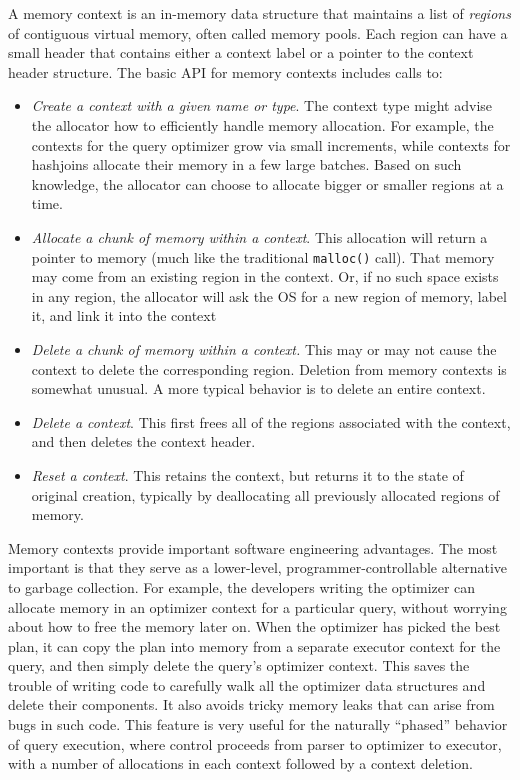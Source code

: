 \documentclass[a4paper,11pt,twoside,openright]{book}
\begin{document}
A memory context is an in-memory data structure that maintains a list of
\emph{regions} of contiguous virtual memory, often called memory pools.
Each region can have a small header that contains either a context label
or a pointer to the context header structure. The basic API for memory
contexts includes calls to:

\begin{itemize}

\item
  \emph{Create a context with a given name or type}. The context type
  might advise the allocator how to efficiently handle memory
  allocation. For example, the contexts for the query optimizer grow via
  small increments, while contexts for hashjoins allocate their memory
  in a few large batches. Based on such knowledge, the allocator can
  choose to allocate bigger or smaller regions at a time.
\end{itemize}

\begin{itemize}
\item
  \emph{Allocate a chunk of memory within a context}. This allocation
  will return a pointer to memory (much like the traditional \texttt{malloc()}
  call). That memory may come from an existing region in the context.
  Or, if no such space exists in any region, the allocator will ask the
  OS for a new region of memory, label it, and link it into the context
\item
  \emph{Delete a chunk of memory within a context.} This may or may not
  cause the context to delete the corresponding region. Deletion from
  memory contexts is somewhat unusual. A more typical behavior is to
  delete an entire context.
\item
  \emph{Delete a context}. This first frees all of the regions
  associated with the context, and then deletes the context header.
\item
  \emph{Reset a context}. This retains the context, but returns it to
  the state of original creation, typically by deallocating all
  previously allocated regions of memory.
\end{itemize}

Memory contexts provide important software engineering advantages. The
most important is that they serve as a lower-level,
programmer-controllable alternative to garbage collection. For example,
the developers writing the optimizer can allocate memory in an optimizer
context for a particular query, without worrying about how to free the
memory later on. When the optimizer has picked the best plan, it can
copy the plan into memory from a separate executor context for the
query, and then simply delete the query's optimizer context. This saves
the trouble of writing code to carefully walk all the optimizer data
structures and delete their components. It also avoids tricky memory
leaks that can arise from bugs in such code. This feature is very useful
for the naturally ``phased'' behavior of query execution, where control
proceeds from parser to optimizer to executor, with a number of
allocations in each context followed by a context deletion.
\end{document}
